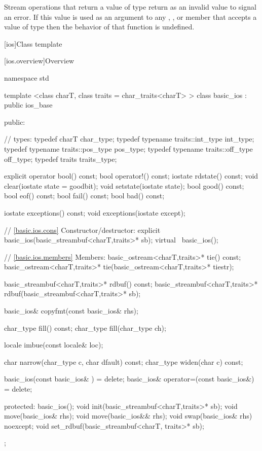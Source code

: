 \pnum
Stream operations that return a value of type
return
as an invalid value to signal an error.
If this value is used as an argument to any
,
,
or
 member
that accepts a value of type
then the behavior of that function is undefined.
%

[ios]{Class template }

[ios.overview]{Overview}

%
\begin{codeblock}
namespace std {
  template <class charT, class traits = char_traits<charT> >
  class basic_ios : public ios_base {
  public:

    // types:
    typedef charT                     char_type;
    typedef typename traits::int_type int_type;
    typedef typename traits::pos_type pos_type;
    typedef typename traits::off_type off_type;
    typedef traits                    traits_type;

    explicit operator bool() const;
    bool operator!() const;
    iostate rdstate() const;
    void clear(iostate state = goodbit);
    void setstate(iostate state);
    bool good() const;
    bool eof()  const;
    bool fail() const;
    bool bad()  const;

    iostate exceptions() const;
    void exceptions(iostate except);

    // \ref{basic.ios.cons} Constructor/destructor:
    explicit basic_ios(basic_streambuf<charT,traits>* sb);
    virtual ~basic_ios();

    // \ref{basic.ios.members} Members:
    basic_ostream<charT,traits>* tie() const;
    basic_ostream<charT,traits>* tie(basic_ostream<charT,traits>* tiestr);

    basic_streambuf<charT,traits>* rdbuf() const;
    basic_streambuf<charT,traits>* rdbuf(basic_streambuf<charT,traits>* sb);

    basic_ios& copyfmt(const basic_ios& rhs);

    char_type fill() const;
    char_type fill(char_type ch);

    locale imbue(const locale& loc);

    char     narrow(char_type c, char dfault) const;
    char_type widen(char c) const;

    basic_ios(const basic_ios& ) = delete;
    basic_ios& operator=(const basic_ios&) = delete;

  protected:
    basic_ios();
    void init(basic_streambuf<charT,traits>* sb);
    void move(basic_ios& rhs);
    void move(basic_ios&& rhs);
    void swap(basic_ios& rhs) noexcept;
    void set_rdbuf(basic_streambuf<charT, traits>* sb);

  };
}
\end{codeblock}

